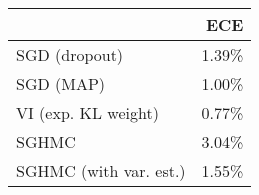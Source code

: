 \begin{tabular}{lr}
\toprule
{} &   ECE \\
\midrule
SGD (dropout)          & 1.39\% \\
SGD (MAP)              & 1.00\% \\
VI (exp. KL weight)    & 0.77\% \\
SGHMC                  & 3.04\% \\
SGHMC (with var. est.) & 1.55\% \\
\bottomrule
\end{tabular}
